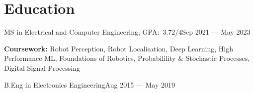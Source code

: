 \section{Education}
\resumeSubHeadingListStart{}

{MS in Electrical and Computer Engineering;  GPA:\ 3.72/4}{Sep 2021 --- May 2023}
{\item[]\small{\textbf{Coursework:} Robot Perception, Robot Localisation, Deep Learning, High Performance ML,
		Foundations of Robotics, Probabilility \& Stochastic Processes, Digital Signal Processing} \vspace{-4pt}}

{B.Eng in Electronics Engineering}{Aug 2015 --- May 2019}

\resumeSubHeadingListEnd{}{}{}